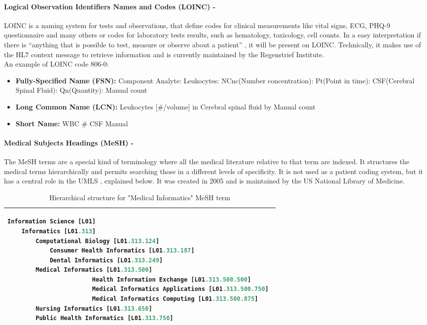 \documentclass[mim_thesis.tex]{subfiles}
\begin{document}
\paragraph{\textbf{Logical Observation Identifiers Names and Codes (LOINC) -}}
LOINC is a naming system for tests and observations, that define codes for clinical measurements like vital signs, ECG, PHQ-9 questionnaire and many others or codes for laboratory tests results, such as hematology, toxicology, cell counts. In a easy interpretation if there is “anything that is possible to test, measure or observe about a patient” \citep{Loinc2018}, it will be present on LOINC. Technically, it makes use of the HL7 context message to retrieve information and is currently maintained by the Regenstrief Institute.\\

An example of LOINC code 806-0: \citep{LoincTERMS2018}
\begin{itemize}[noitemsep]
\item \textbf{Fully-Specified Name (FSN):} Component Analyte: Leukocytes: NCnc(Number concentration): Pt(Point in time): CSF(Cerebral Spinal Fluid): Qn(Quantity): Manual count
\item \textbf{Long Common Name (LCN):} Leukocytes [\#/volume] in Cerebral spinal fluid by Manual count
\item \textbf{Short Name:} WBC \# CSF Manual
\end{itemize}

\paragraph{\textbf{Medical Subjects Headings (MeSH) -}}
The MeSH terms are a special kind of terminology where all the medical literature relative to that term are indexed. It structures the medical terms hierarchically and permits searching those in a different levels of specificity. It is not used as a patient coding system, but it has a central role in the UMLS \citep{hammond2014standards}, explained below. It was created in 2005 and is maintained by the US National Library of Medicine.

\begin{table}[H]
	\centering
\caption{Hierarchical structure for "Medical Informatics" MeSH term}
\label{tab:mesh}
\begin{tabular}{l}
\toprule[2pt]
\begin{lstlisting}[language=octave]
Information Science [L01]
	Informatics [L01.313]
		Computational Biology [L01.313.124]
        	Consumer Health Informatics [L01.313.187]
        	Dental Informatics [L01.313.249]
		Medical Informatics [L01.313.500]
            			Health Information Exchange [L01.313.500.500]
            			Medical Informatics Applications [L01.313.500.750] 
            			Medical Informatics Computing [L01.313.500.875] 
		Nursing Informatics [L01.313.650]
		Public Health Informatics [L01.313.750]

\end{lstlisting}
\tabularnewline \bottomrule[2pt]
\end{tabular}
\end{table}
\end{document}
